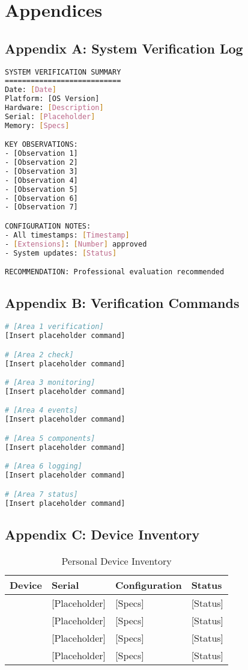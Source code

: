 \documentclass[11pt, a4paper]{article}
\begin{document}
\section{Appendices}

\subsection{Appendix A: System Verification Log}
\begin{lstlisting}[language=bash, caption={System Verification Summary - [Date]}, label={lst:verification_summary}]
SYSTEM VERIFICATION SUMMARY
===========================
Date: [Date]
Platform: [OS Version]
Hardware: [Description]
Serial: [Placeholder]
Memory: [Specs]

KEY OBSERVATIONS:
- [Observation 1]
- [Observation 2]
- [Observation 3]
- [Observation 4]
- [Observation 5]
- [Observation 6]
- [Observation 7]

CONFIGURATION NOTES:
- All timestamps: [Timestamp]
- [Extensions]: [Number] approved
- System updates: [Status]

RECOMMENDATION: Professional evaluation recommended
\end{lstlisting}

\subsection{Appendix B: Verification Commands}
\begin{lstlisting}[language=bash, caption={System Analysis Commands}, label={lst:analysis_commands}]
# [Area 1 verification]
[Insert placeholder command]

# [Area 2 check]
[Insert placeholder command]

# [Area 3 monitoring]
[Insert placeholder command]

# [Area 4 events]
[Insert placeholder command]

# [Area 5 components]
[Insert placeholder command]

# [Area 6 logging]
[Insert placeholder command]

# [Area 7 status]
[Insert placeholder command]
\end{lstlisting}

\subsection{Appendix C: Device Inventory}
\begin{table}[H]
\centering
\caption{Personal Device Inventory}
\label{tab:device_inventory}
\begin{tabular}{@{}p{3cm}p{2cm}p{3cm}p{4cm}@{}}
\toprule
\textbf{Device} & \textbf{Serial} & \textbf{Configuration} & \textbf{Status} \\ \midrule
[Device 1] & [Placeholder] & [Specs] & [Status] \\
[Device 2] & [Placeholder] & [Specs] & [Status] \\
[Device 3] & [Placeholder] & [Specs] & [Status] \\
[Device 4] & [Placeholder] & [Specs] & [Status] \\ \bottomrule
\end{tabular}
\end{table}
\end{document}
